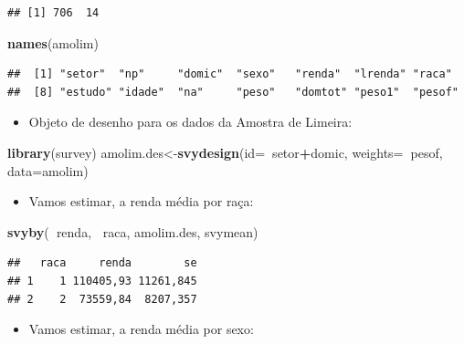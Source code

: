 \documentclass[]{book}
\newenvironment{Shaded}{\begin{snugshade}}{\end{snugshade}}
\newcommand{\KeywordTok}[1]{\textcolor[rgb]{0.13,0.29,0.53}{\textbf{#1}}}
\newcommand{\DataTypeTok}[1]{\textcolor[rgb]{0.13,0.29,0.53}{#1}}
\newcommand{\OperatorTok}[1]{\textcolor[rgb]{0.81,0.36,0.00}{\textbf{#1}}}
\newcommand{\NormalTok}[1]{#1}
\providecommand{\tightlist}{%
  \setlength{\itemsep}{0pt}\setlength{\parskip}{0pt}}
\theoremstyle{definition}
\theoremstyle{definition}
\theoremstyle{definition}
\theoremstyle{remark}
\begin{document}
\begin{verbatim}
## [1] 706  14
\end{verbatim}

\begin{Shaded}
\begin{Highlighting}[]
\KeywordTok{names}\NormalTok{(amolim)}
\end{Highlighting}
\end{Shaded}

\begin{verbatim}
##  [1] "setor"  "np"     "domic"  "sexo"   "renda"  "lrenda" "raca"  
##  [8] "estudo" "idade"  "na"     "peso"   "domtot" "peso1"  "pesof"
\end{verbatim}

\begin{itemize}
\tightlist
\item
  Objeto de desenho para os dados da Amostra de Limeira:
\end{itemize}

\begin{Shaded}
\begin{Highlighting}[]
\KeywordTok{library}\NormalTok{(survey)}
\NormalTok{amolim.des<-}\KeywordTok{svydesign}\NormalTok{(}\DataTypeTok{id=}\OperatorTok{~}\NormalTok{setor}\OperatorTok{+}\NormalTok{domic, }\DataTypeTok{weights=}\OperatorTok{~}\NormalTok{pesof,}
  \DataTypeTok{data=}\NormalTok{amolim)}
\end{Highlighting}
\end{Shaded}

\begin{itemize}
\tightlist
\item
  Vamos estimar, a renda média por raça:
\end{itemize}

\begin{Shaded}
\begin{Highlighting}[]
\KeywordTok{svyby}\NormalTok{(}\OperatorTok{~}\NormalTok{renda, }\OperatorTok{~}\NormalTok{raca, amolim.des, svymean)}
\end{Highlighting}
\end{Shaded}

\begin{verbatim}
##   raca     renda        se
## 1    1 110405,93 11261,845
## 2    2  73559,84  8207,357
\end{verbatim}

\begin{itemize}
\tightlist
\item
  Vamos estimar, a renda média por sexo:
\end{itemize}
\end{document}
